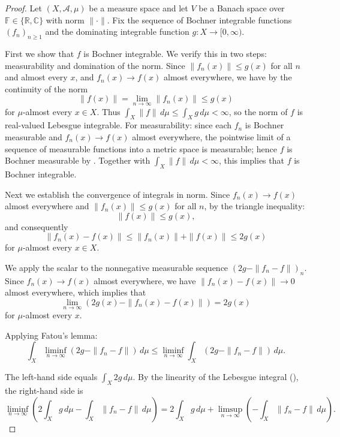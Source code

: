 \begin{proof}
Let $(X, \mathcal{A}, \mu)$ be a measure space and let $V$ be a Banach space over $\mathbb{F} \in \{\mathbb{R}, \mathbb{C}\}$ with norm $\|\cdot\|$. Fix the sequence of Bochner integrable functions $(f_n)_{n \geq 1}$ and the dominating integrable function $g : X \to [0, \infty)$.

First we show that $f$ is Bochner integrable. We verify this in two steps: measurability and domination of the norm. Since $\|f_n(x)\| \leq g(x)$ for all $n$ and almost every $x$, and $f_n(x) \to f(x)$ almost everywhere, we have by the continuity of the norm
$$\|f(x)\| = \lim_{n \to \infty} \|f_n(x)\| \leq g(x)$$
for $\mu$-almost every $x \in X$. Thus $\int_X \|f\|\,d\mu \leq \int_X g\,d\mu < \infty$, so the norm of $f$ is real-valued Lebesgue integrable. For measurability: since each $f_n$ is Bochner measurable and $f_n(x) \to f(x)$ almost everywhere, the pointwise limit of a sequence of measurable functions into a metric space is measurable; hence $f$ is Bochner measurable by . Together with $\int_X \|f\|\,d\mu < \infty$, this implies that $f$ is Bochner integrable.

Next we establish the convergence of integrals in norm. Since $f_n(x) \to f(x)$ almost everywhere and $\|f_n(x)\| \leq g(x)$ for all $n$, by the triangle inequality:
$$\|f(x)\| \leq g(x),$$
and consequently
$$\|f_n(x) - f(x)\| \leq \|f_n(x)\| + \|f(x)\| \leq 2g(x)$$
for $\mu$-almost every $x \in X$.

We apply the scalar  to the nonnegative measurable sequence $(2g - \|f_n - f\|)_n$. Since $f_n(x) \to f(x)$ almost everywhere, we have $\|f_n(x) - f(x)\| \to 0$ almost everywhere, which implies that
$$\lim_{n \to \infty} (2g(x) - \|f_n(x) - f(x)\|) = 2g(x)$$
for $\mu$-almost every $x$.

Applying Fatou's lemma:
$$\int_X \liminf_{n \to \infty} (2g - \|f_n - f\|)\,d\mu \leq \liminf_{n \to \infty} \int_X (2g - \|f_n - f\|)\,d\mu.$$

The left-hand side equals $\int_X 2g\,d\mu$. By the linearity of the Lebesgue integral (), the right-hand side is
$$\liminf_{n \to \infty} \left( 2\int_X g\,d\mu - \int_X \|f_n - f\|\,d\mu \right) = 2\int_X g\,d\mu + \limsup_{n \to \infty} \left( -\int_X \|f_n - f\|\,d\mu \right).$$


\end{proof}
